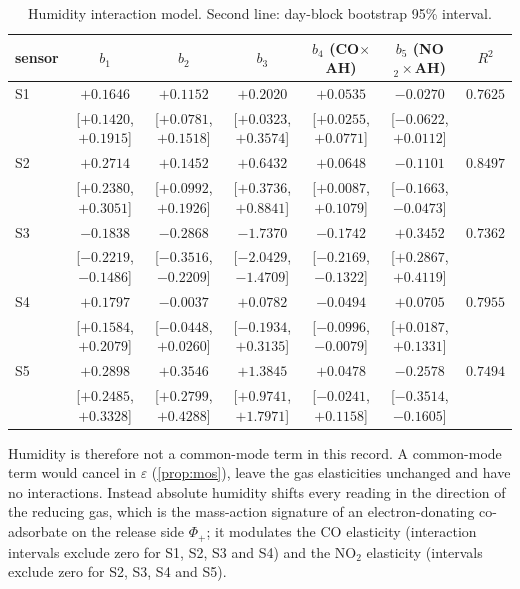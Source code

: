\documentclass[11pt]{article}
\theoremstyle{definition}\newtheorem{definition}[theorem]{Definition}
\theoremstyle{remark}\newtheorem{remark}[theorem]{Remark}
\begin{document}
\begin{table}[htbp]\centering
\caption{Humidity interaction model. Second line: day-block bootstrap 95\% interval.}\label{tab:hum}
\scriptsize\setlength{\tabcolsep}{3.5pt}
\begin{tabular}{@{}lcccccc@{}}\toprule
sensor & $b_1$ & $b_2$ & $b_3$ & $b_4$ (CO$\times$AH) & $b_5$ (NO$_2\times$AH) & $R^2$\\\midrule
S1 & $+0.1646$ & $+0.1152$ & $+0.2020$ & $+0.0535$ & $-0.0270$ & $0.7625$\\
 & [$+0.1420$, $+0.1915$] & [$+0.0781$, $+0.1518$] & [$+0.0323$, $+0.3574$] & [$+0.0255$, $+0.0771$] & [$-0.0622$, $+0.0112$] & \\
S2 & $+0.2714$ & $+0.1452$ & $+0.6432$ & $+0.0648$ & $-0.1101$ & $0.8497$\\
 & [$+0.2380$, $+0.3051$] & [$+0.0992$, $+0.1926$] & [$+0.3736$, $+0.8841$] & [$+0.0087$, $+0.1079$] & [$-0.1663$, $-0.0473$] & \\
S3 & $-0.1838$ & $-0.2868$ & $-1.7370$ & $-0.1742$ & $+0.3452$ & $0.7362$\\
 & [$-0.2219$, $-0.1486$] & [$-0.3516$, $-0.2209$] & [$-2.0429$, $-1.4709$] & [$-0.2169$, $-0.1322$] & [$+0.2867$, $+0.4119$] & \\
S4 & $+0.1797$ & $-0.0037$ & $+0.0782$ & $-0.0494$ & $+0.0705$ & $0.7955$\\
 & [$+0.1584$, $+0.2079$] & [$-0.0448$, $+0.0260$] & [$-0.1934$, $+0.3135$] & [$-0.0996$, $-0.0079$] & [$+0.0187$, $+0.1331$] & \\
S5 & $+0.2898$ & $+0.3546$ & $+1.3845$ & $+0.0478$ & $-0.2578$ & $0.7494$\\
 & [$+0.2485$, $+0.3328$] & [$+0.2799$, $+0.4288$] & [$+0.9741$, $+1.7971$] & [$-0.0241$, $+0.1158$] & [$-0.3514$, $-0.1605$] & \\\bottomrule
\end{tabular}
\end{table}

Humidity is therefore not a common-mode term in this record. A common-mode term would cancel in $\varepsilon$ (\cref{prop:mos}), leave the gas elasticities unchanged and have no interactions. Instead absolute humidity shifts every reading in the direction of the reducing gas, which is the mass-action signature of an electron-donating co-adsorbate on the release side $\Phi_+$; it modulates the CO elasticity (interaction intervals exclude zero for S1, S2, S3 and S4) and the NO$_2$ elasticity (intervals exclude zero for S2, S3, S4 and S5).
\end{document}
